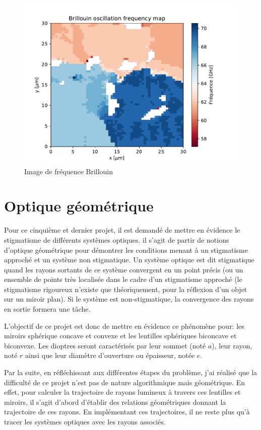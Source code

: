 \documentclass[a4paper,11pt]{article}
\begin{document}
\begin{figure}[H]
	\centering
	\includegraphics[scale=0.8]{Figures/Brillouin_freq_map.pdf}
	\caption{Image de fréquence Brillouin}
	\label{fig:tds2} 
\end{figure}





\newpage
\section{Optique géométrique}
Pour ce cinquième et dernier projet, il est demandé de mettre en évidence le stigmatisme de différents systèmes optiques. il s'agit de partir de notions d'optique géométrique pour démontrer les conditions menant à un stigmatisme approché et un système non stigmatique. Un système optique est dit stigmatique quand les rayons sortants de ce système convergent en un point précis (ou un ensemble de points très localisée dans le cadre d'un stigmatisme approché (le stigmatisme rigoureux n'existe que théoriquement, pour la réflexion d'un objet sur un miroir plan). Si le système est non-stigmatique, la convergence des rayons en sortie formera une tâche.

L'objectif de ce projet est donc de mettre en évidence ce phénomène pour: les miroirs sphérique concave et convexe et les lentilles sphériques biconcave et biconvexe. Les dioptres seront caractérisés par leur sommet (noté $a$), leur rayon, noté $r$ ainsi que leur diamètre d'ouverture ou épaisseur, notée $e$.

Par la suite, en réfléchissant aux différentes étapes du problème, j'ai réalisé que la difficulté de ce projet n'est pas de nature algorithmique mais géométrique. En effet, pour calculer la trajectoire de rayons lumineux à travers ces lentilles et miroirs, il s'agit d'abord d'établir des relations géométriques donnant la trajectoire de ces rayons. En implémentant ces trajectoires, il ne reste plus qu'à tracer les systèmes optiques avec les rayons associés.
\end{document}

